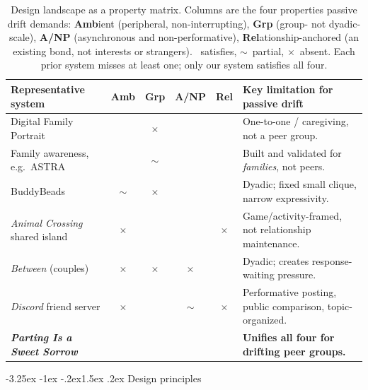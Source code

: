\documentclass[11pt]{article}
\makeatletter
\renewcommand\subsection{\@startsection{subsection}{2}{\z@}%
  {-3.25ex \@plus -1ex \@minus -.2ex}{1.5ex \@plus .2ex}%
  {\normalfont\large\bfseries\color{accent}}}
\newcommand{\cmark}{\textcolor{accent}{\checkmark}}
\newcommand{\xmark}{\textcolor{rust}{\ensuremath{\times}}}
\newcommand{\pmark}{\textcolor{rust}{\ensuremath{\sim}}}
\makeatother
\begin{document}
\begin{table}[t]
\centering
\caption{Design landscape as a property matrix. Columns are the four properties passive drift demands:
\textbf{Amb}ient (peripheral, non-interrupting), \textbf{Grp} (group- not dyadic-scale),
\textbf{A/NP} (asynchronous and non-performative), \textbf{Rel}ationship-anchored (an existing bond,
not interests or strangers). \cmark{}~satisfies, \pmark{}~partial, \xmark{}~absent. Each prior system
misses at least one; only our system satisfies all four.}
\label{tab:landscape}
\small
\setlength{\tabcolsep}{4pt}
\begin{tabularx}{\textwidth}{>{\raggedright\arraybackslash}p{4.2cm} c c c c >{\raggedright\arraybackslash}X}
\toprule
Representative system & Amb & Grp & A/NP & Rel & Key limitation for passive drift \\
\midrule
Digital Family Portrait \citep{mynatt2001} & \cmark & \xmark & \cmark & \cmark & One-to-one / caregiving, not a peer group. \\
\rowcolor{rowgray}
Family awareness, e.g.\ ASTRA \citep{markopoulos2004} & \cmark & \pmark & \cmark & \cmark & Built and validated for \emph{families}, not peers. \\
BuddyBeads \citep{kikingil2006} & \pmark & \xmark & \cmark & \cmark & Dyadic; fixed small clique, narrow expressivity. \\
\rowcolor{rowgray}
\emph{Animal Crossing} shared island & \xmark & \cmark & \cmark & \xmark & Game/activity-framed, not relationship maintenance. \\
\emph{Between} (couples) & \xmark & \xmark & \xmark & \cmark & Dyadic; creates response-waiting pressure. \\
\rowcolor{rowgray}
\emph{Discord} friend server & \xmark & \cmark & \pmark & \xmark & Performative posting, public comparison, topic-organized. \\
\midrule
\textbf{\textit{Parting Is a Sweet Sorrow}} & \cmark & \cmark & \cmark & \cmark & \textbf{Unifies all four for drifting peer groups.} \\
\bottomrule
\end{tabularx}
\end{table}

\subsection{Design principles}
\end{document}
